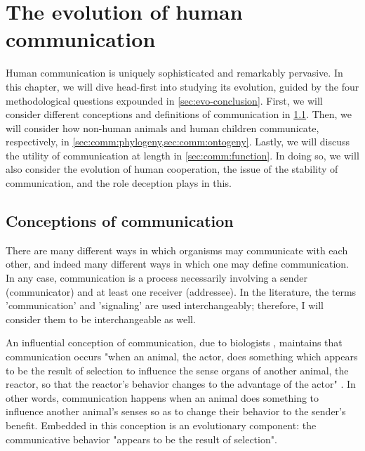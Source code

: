 \chapter{The evolution of human communication}
\label{ch:communication}

\pagestyle{mystyle}

Human communication is uniquely sophisticated and remarkably pervasive.
In this chapter, we will dive head-first into studying its evolution, guided by the four methodological questions expounded in \cref{sec:evo-conclusion}.
First, we will consider different conceptions and definitions of communication in \cref{sec:comm:definition}. Then, we will consider how non-human animals and human children communicate, respectively, in \cref{sec:comm:phylogeny,sec:comm:ontogeny}. Lastly, we will discuss the utility of communication at length in \cref{sec:comm:function}. In doing so, we will also consider the evolution of human cooperation, the issue of the stability of communication, and the role deception plays in this.

\section{Conceptions of communication}
\label{sec:comm:definition}

There are many different ways in which organisms may communicate with each other, and indeed many different ways in which one may define communication. In any case, communication is a process necessarily involving a sender (communicator) and at least one receiver (addressee). In the literature, the terms 'communication' and 'signaling' are used interchangeably; therefore, I will consider them to be interchangeable as well.

An influential conception of communication, due to biologists \citet{DawkinsKrebs78}, maintains that communication occurs "when an animal, the actor, does something which appears to be the result of selection to influence the sense organs of another animal, the reactor, so that the reactor's behavior changes to the advantage of the actor" \citep[p.~283]{DawkinsKrebs78}.
In other words, communication happens when an animal does something to influence another animal's senses so as to change their behavior to the sender's benefit.
Embedded in this conception is an evolutionary component: the communicative behavior "appears to be the result of selection".


